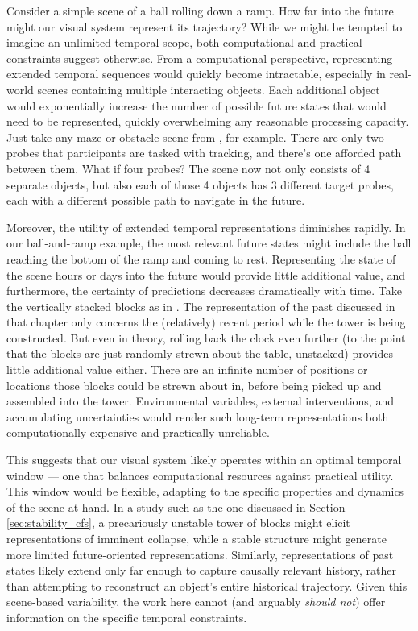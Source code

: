 Consider a simple scene of a ball rolling down a ramp.  How far into the future might our visual system represent its trajectory?  While we might be tempted to imagine an unlimited temporal scope, both computational and practical constraints suggest otherwise.  From a computational perspective, representing extended temporal sequences would quickly become intractable, especially in real-world scenes containing multiple interacting objects.  Each additional object would exponentially increase the number of possible future states that would need to be represented, quickly overwhelming any reasonable processing capacity.  Just take any maze or obstacle scene from , for example.  There are only two probes that participants are tasked with tracking, and there’s one afforded path between them.  What if four probes?  The scene now not only consists of 4 separate objects, but also each of those 4 objects has 3 different target probes, each with a different possible path to navigate in the future.
 
Moreover, the utility of extended temporal representations diminishes rapidly. In our ball-and-ramp example, the most relevant future states might include the ball reaching the bottom of the ramp and coming to rest.  Representing the state of the scene hours or days into the future would provide little additional value, and furthermore, the certainty of predictions decreases dramatically with time.  Take the vertically stacked blocks as in .  The representation of the past discussed in that chapter only concerns the (relatively) recent period while the tower is being constructed.  But even in theory, rolling back the clock even further (to the point that the blocks are just randomly strewn about the table, unstacked) provides little additional value either.  There are an infinite number of positions or locations those blocks could be strewn about in, before being picked up and assembled into the tower.  Environmental variables, external interventions, and accumulating uncertainties would render such long-term representations both computationally expensive and practically unreliable.
 
This suggests that our visual system likely operates within an optimal temporal window --- one that balances computational resources against practical utility. This window would be flexible, adapting to the specific properties and dynamics of the scene at hand.  In a study such as the one discussed in Section \ref{sec:stability_cfs}, a precariously unstable tower of blocks might elicit representations of imminent collapse, while a stable structure might generate more limited future-oriented representations.  Similarly, representations of past states likely extend only far enough to capture causally relevant history, rather than attempting to reconstruct an object's entire historical trajectory.  Given this scene-based variability, the work here cannot (and arguably \textit{should not}) offer information on the specific temporal constraints. 

